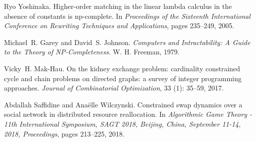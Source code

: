 \begin{thebibliography}{27}
Ryo Yoshinaka.
\newblock Higher-order matching in the linear lambda calculus in the absence of
  constants is np-complete.
\newblock In \emph{Proceedings of the Sixteenth International Conference on
  Rewriting Techniques and Applications}, pages 235--249, 2005.

Michael~R. Garey and David~S. Johnson.
\newblock \emph{Computers and Intractability: {A} Guide to the Theory of
  NP-Completeness}.
\newblock W. H. Freeman, 1979.

Vicky~H. Mak{-}Hau.
\newblock On the kidney exchange problem: cardinality constrained cycle and
  chain problems on directed graphs: a survey of integer programming
  approaches.
\newblock \emph{Journal of Combinatorial Optimization}, 33
  (1): 35--59, 2017.

Abdallah Saffidine and Ana{\"{e}}lle Wilczynski.
\newblock Constrained swap dynamics over a social network in distributed
  resource reallocation.
\newblock In \emph{Algorithmic Game Theory - 11th International Symposium,
  {SAGT} 2018, Beijing, China, September 11-14, 2018, Proceedings}, pages
  213--225, 2018.

\end{thebibliography}




